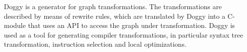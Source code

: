 Doggy is a generator for graph transformations.
The transformations are described by means of rewrite rules,
which are translated by Doggy into a C-module that uses
an API to access the graph under transformation.
Doggy is used as a tool for generating compiler transformations,
in particular syntax tree transformation, 
instruction selection and local optimizations.
